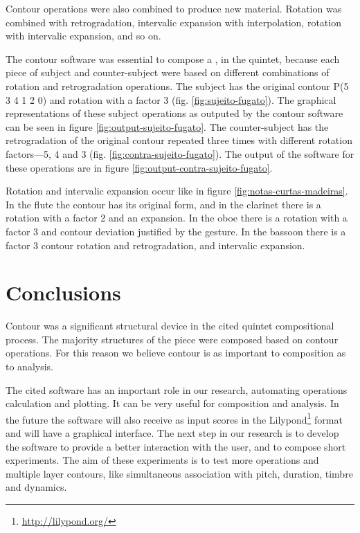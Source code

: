 Contour operations were also combined to produce new material.
Rotation was combined with retrogradation, intervalic expansion with
interpolation, rotation with intervalic expansion, and so on.

The contour software was essential to compose a , in the
quintet, because each piece of subject and counter-subject were based
on different combinations of rotation and retrogradation operations.
The subject has the original contour P(5 3 4 1 2 0) and rotation with
a factor 3 (fig. \ref{fig:sujeito-fugato}). The graphical
representations of these subject operations as outputed by the contour
software can be seen in figure \ref{fig:output-sujeito-fugato}. The
counter-subject has the retrogradation of the original contour repeated
three times with different rotation factors---5, 4 and 3 (fig.
\ref{fig:contra-sujeito-fugato}). The output of the software for these
operations are in figure \ref{fig:output-contra-sujeito-fugato}.

Rotation and intervalic expansion occur like in figure
\ref{fig:notas-curtas-madeiras}. In the flute the contour has its
original form, and in the clarinet there is a rotation with a factor 2
and an expansion. In the oboe there is a rotation with a factor 3 and
contour deviation justified by the gesture. In the bassoon there is a
factor 3 contour rotation and retrogradation, and intervalic
expansion.

\section{Conclusions}
\label{sec:conclusions}

Contour was a significant structural device in the cited quintet
compositional process. The majority structures of the piece were
composed based on contour operations. For this reason we believe
contour is as important to composition as to analysis.

The cited software has an important role in our research, automating
operations calculation and plotting. It can be very useful for
composition and analysis. In the future the software will also receive
as input scores in the Lilypond\footnote{\url{http://lilypond.org/}}
format and will have a graphical interface. The next step in our
research is to develop the software to provide a better interaction
with the user, and to compose short experiments. The aim of these
experiments is to test more operations and multiple layer contours,
like simultaneous association with pitch, duration, timbre and
dynamics.


